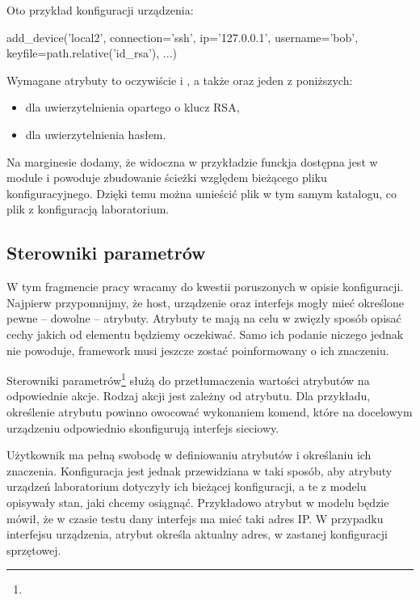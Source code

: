 \documentclass[00-praca-magisterska.tex]{subfiles}
\begin{document}
Oto przykład konfiguracji urządzenia:

\begin{pythoncode}
  add_device('local2',
    connection='ssh',
    ip='127.0.0.1',
    username='bob',
    keyfile=path.relative('id_rsa'),
    ...)
\end{pythoncode}

Wymagane atrybuty to oczywiście  i , a także
 oraz jeden z poniższych:
\begin{itemize}
\item {} dla uwierzytelnienia opartego o klucz RSA,
\item {} dla uwierzytelnienia hasłem.
\end{itemize}

Na marginesie dodamy, że widoczna w przykładzie funckja 
dostępna jest w module  i powoduje zbudowanie ścieżki względem
bieżącego pliku konfiguracyjnego. Dzięki temu można umieścić plik
 w tym samym katalogu, co plik z konfiguracją laboratorium.

\subsection{Sterowniki parametrów}

W tym fragmencie pracy wracamy do kwestii poruszonych w opisie konfiguracji.
Najpierw przypomnijmy, że host, urządzenie oraz interfejs mogły mieć określone
pewne -- dowolne -- atrybuty. Atrybuty te mają na celu w zwięzły sposób opisać
cechy jakich od elementu będziemy oczekiwać. Samo ich podanie niczego jednak nie
powoduje, framework musi jeszcze zostać poinformowany o ich znaczeniu.

Sterowniki parametrów\footnote{} służą do przetłumaczenia
wartości atrybutów na odpowiednie akcje. Rodzaj akcji jest zależny od atrybutu.
Dla przykładu, określenie atrybutu  powinno owocować wykonaniem komend,
które na docelowym urządzeniu odpowiednio skonfigurują interfejs sieciowy.

Użytkownik ma pełną swobodę w definiowaniu atrybutów i określaniu ich
znaczenia. Konfiguracja jest jednak przewidziana w taki sposób, aby atrybuty
urządzeń laboratorium dotyczyły ich bieżącej konfiguracji, a te z modelu
opisywały stan, jaki chcemy osiągnąć. Przykładowo atrybut  w modelu
będzie mówił, że w czasie testu dany interfejs ma mieć taki adres IP. W
przypadku interfejsu urządzenia, atrybut  określa aktualny adres, w
zastanej konfiguracji sprzętowej.
\end{document}
